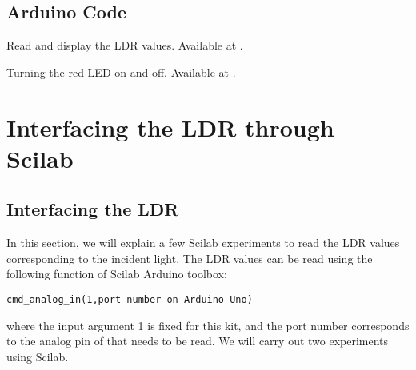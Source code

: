 \subsection{Arduino Code}
\label{sec:ldr-arduino-code}

\begin{ardcode}
{Read and display the LDR values.  Available at
  .}
\label{ard:ldr-read}

\end{ardcode}

\begin{ardcode}
{Turning the red LED on and off.  Available at
  .}
\label{ard:ldr-led}

\end{ardcode}

\section{Interfacing the LDR through Scilab}
\subsection{Interfacing the LDR}
In this section, we will explain a few Scilab experiments to read the
LDR values corresponding to the incident light. The LDR values can be
read using the following function of Scilab Arduino toolbox:
\begin{lstlisting}[style=nonumbers]
  cmd_analog_in(1,port number on Arduino Uno)
\end{lstlisting}
where the input argument 1 is fixed for this kit, and the port number corresponds to the analog pin of \arduino that needs to be read.  We will carry out two experiments using Scilab.

